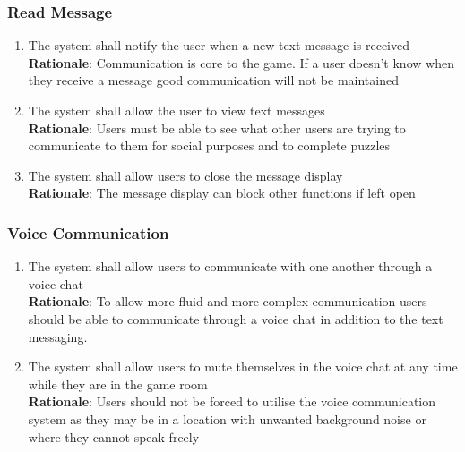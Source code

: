 \documentclass[12pt]{article}
\begin{document}
\subsubsection{Read Message}
    \begin{enumerate}[label=RM\arabic*., series=ReadMessage]
        \item The system shall notify the user when a new text message is received\\
        \textbf{Rationale}: Communication is core to the game. If a user doesn't know when they receive a message good communication will not be maintained
        \item The system shall allow the user to view text messages\\
        \textbf{Rationale}: Users must be able to see what other users are trying to communicate to them for social purposes and to complete puzzles
        \item The system shall allow users to close the message display\\
        \textbf{Rationale}: The message display can block other functions if left open
    \end{enumerate}
\subsubsection{Voice Communication}
    \begin{enumerate}[label=VM\arabic*., series=VoiceMessage]
        \item The system shall allow users to communicate with one another through a voice chat\\
        \textbf{Rationale}: To allow more fluid and more complex communication users should be able to communicate through a voice chat in addition to the text messaging.
        \item The system shall allow users to mute themselves in the voice chat at any time while they are in the game room\\
        \textbf{Rationale}: Users should not be forced to utilise the voice communication system as they may be in a location with unwanted background noise or where they cannot speak freely
    \end{enumerate}
\end{document}

